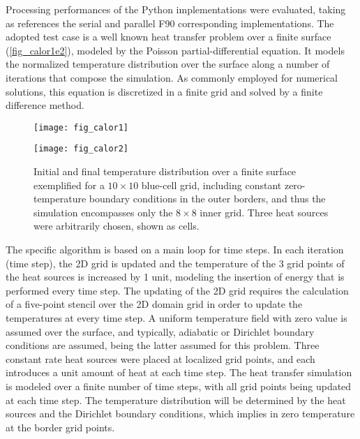 Processing performances of the Python implementations were evaluated, taking as references the serial and parallel F90 corresponding implementations. The adopted test case is a well known heat transfer problem over a finite surface (\autoref {fig_calor1e2}), modeled by the Poisson partial-differential equation. It models the normalized temperature distribution over the surface along a number of iterations that compose the simulation. As commonly employed for numerical solutions, this equation is discretized in a finite grid and solved by a finite difference method. 

    \begin{figure}[hbtp]
    \caption{Initial and final temperature distribution over a finite surface exemplified for a $10 \times 10$  blue-cell grid, including constant zero-temperature boundary conditions in the outer borders, and thus the simulation encompasses only the $8 \times 8$ inner grid. Three heat sources were arbitrarily chosen, shown as  cells.}
    \vspace{4mm}
    \begin{minipage}[t]{.46\textwidth}
    \begin{center}
    \texttt{[image: fig\_calor1]}
    \end{center}
    \vspace{3mm}
    \end{minipage}
    \hfill
    \begin{minipage}[t]{.46\textwidth}
    \begin{center}
    \texttt{[image: fig\_calor2]}
    \end{center}
    \vspace{3mm}
    \end{minipage}
    \vspace{5mm}
    \legenda{}
    \label{fig_calor1e2}
    \end{figure}

The specific algorithm is based on a main loop for time steps. In each iteration (time step), the 2D grid is updated and the temperature of the 3 grid points of the heat sources is increased by 1 unit, modeling the insertion of energy that is performed every time step. The updating of the 2D grid requires the calculation of a five-point stencil over the 2D domain grid \cite {Chen2002} in order to update the temperatures at every time step. A uniform temperature field with zero value is assumed over the surface, and typically, adiabatic or Dirichlet  boundary conditions are assumed, being the latter assumed for this problem. Three constant rate heat sources were placed at localized grid points, and each introduces a unit amount of heat at each time step. The heat transfer simulation is modeled over a finite number of time steps, with all grid points being updated at each time step. The temperature distribution will be determined by the heat sources and the Dirichlet boundary conditions, which implies in zero temperature at the border grid points. 

